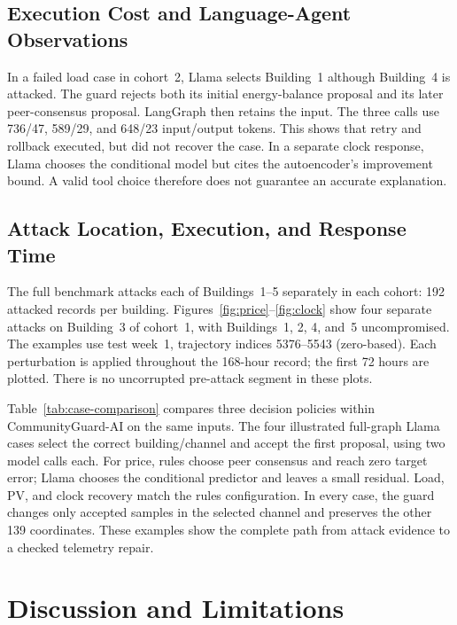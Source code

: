 \documentclass[conference]{IEEEtran}
\begin{document}
\subsection{Execution Cost and Language-Agent Observations}



In a failed load case in cohort~2, Llama selects Building~1 although Building~4 is attacked. The guard rejects both its initial energy-balance proposal and its later peer-consensus proposal. LangGraph then retains the input. The three calls use 736/47, 589/29, and 648/23 input/output tokens. This shows that retry and rollback executed, but did not recover the case. In a separate clock response, Llama chooses the conditional model but cites the autoencoder's improvement bound. A valid tool choice therefore does not guarantee an accurate explanation.

\subsection{Attack Location, Execution, and Response Time}

The full benchmark attacks each of Buildings~1--5 separately in each cohort: 192 attacked records per building. Figures~\ref{fig:price}--\ref{fig:clock} show four separate attacks on Building~3 of cohort~1, with Buildings~1, 2, 4, and~5 uncompromised. The examples use test week~1, trajectory indices 5376--5543 (zero-based). Each perturbation is applied throughout the 168-hour record; the first 72 hours are plotted. There is no uncorrupted pre-attack segment in these plots.

Table~\ref{tab:case-comparison} compares three decision policies within CommunityGuard-AI on the same inputs. The four illustrated full-graph Llama cases select the correct building/channel and accept the first proposal, using two model calls each. For price, rules choose peer consensus and reach zero target error; Llama chooses the conditional predictor and leaves a small residual. Load, PV, and clock recovery match the rules configuration. In every case, the guard changes only accepted samples in the selected channel and preserves the other 139 coordinates. These examples show the complete path from attack evidence to a checked telemetry repair.




\section{Discussion and Limitations}
\end{document}
